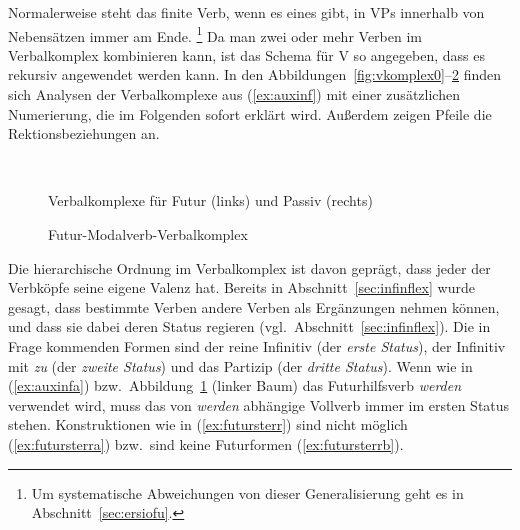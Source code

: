 Normalerweise steht das finite Verb, wenn es eines gibt, in VPs innerhalb von Nebensätzen immer am Ende.%
\footnote{Um systematische Abweichungen von dieser Generalisierung geht es in Abschnitt~\ref{sec:ersiofu}.}
Da man zwei oder mehr Verben im Verbalkomplex kombinieren kann, ist das Schema für V so angegeben, dass es rekursiv angewendet werden kann.
In den Abbildungen~\ref{fig:vkomplex0}--\ref{fig:vkomplex3} finden sich Analysen der Verbalkomplexe aus (\ref{ex:auxinf}) mit einer zusätzlichen Numerierung, die im Folgenden sofort erklärt wird.
Außerdem zeigen Pfeile die Rektionsbeziehungen an.

\begin{figure}
  \centering
  ~
  \vspace{0.3cm}
  \caption{Verbalkomplexe für Futur (links) und Passiv (rechts)}
  \label{fig:vkomplex2}
\end{figure}

\begin{figure}
  \centering
  \vspace{0.3cm}
  \caption{Futur-Modalverb-Verbalkomplex}
  \label{fig:vkomplex3}
\end{figure}


Die hierarchische Ordnung im Verbalkomplex ist davon geprägt, dass jeder der Verbköpfe seine eigene Valenz hat.
Bereits in Abschnitt~\ref{sec:infinflex} wurde gesagt, dass bestimmte Verben andere Verben als Ergänzungen nehmen können, und dass sie dabei deren Status regieren (vgl.\ Abschnitt~\ref{sec:infinflex}).
Die in Frage kommenden Formen sind der reine Infinitiv (der \textit{erste Status}), der Infinitiv mit \textit{zu} (der \textit{zweite Status}) und das Partizip (der \textit{dritte Status}).
Wenn wie in (\ref{ex:auxinfa}) bzw.\ Abbildung~\ref{fig:vkomplex2} (linker Baum) das Futurhilfsverb \textit{werden} verwendet wird, muss das von \textit{werden} abhängige Vollverb immer im ersten Status stehen.
Konstruktionen wie in (\ref{ex:futursterr}) sind nicht möglich (\ref{ex:futursterra}) bzw.\ sind keine Futurformen (\ref{ex:futursterrb}).

